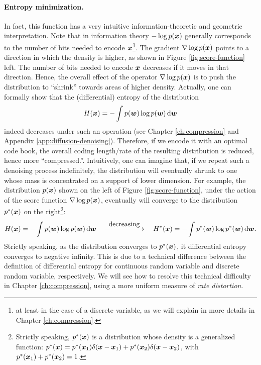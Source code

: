 \documentclass[../../book-main.tex]{subfiles}
\begin{document}
\paragraph{Entropy minimization.} In fact, this function has a very intuitive information-theoretic and geometric interpretation. Note that in information theory $-\log p(\bm{x})$ generally corresponds to the number of bits needed to encode $\bm{x}$\footnote{at least in the case of a discrete variable, as we will explain in more details in Chapter \ref{ch:compression}.}. The gradient $\nabla \log p(\bm{x})$  points to a direction in which the density is higher, as shown in Figure \ref{fig:score-function} left. The number of bits needed to encode $\bm{x}$ decreases if it moves in that direction. Hence, the overall effect of the operator $\nabla \log p(\bm{x})$ is to push the distribution to ``shrink''  towards areas of higher density. Actually, one can formally show that the (differential) entropy of the distribution 
\begin{equation}
H(\x) = - \int p(\boldsymbol{w}) \log p(\boldsymbol{w}) \odif{\boldsymbol{w}}    \end{equation} 
indeed decreases under such an operation (see Chapter \ref{ch:compression} and Appendix \ref{app:diffusion-denoising}). Therefore, if we encode it with an optimal code book, the overall coding length/rate of the resulting distribution is reduced, hence more ``compressed.''. Intuitively, one can imagine that, if we repeat such a denoising process indefinitely, the distribution will eventually shrunk to one whose mass is concentrated on a support of lower dimension. For example, the distribution $p(\bm{x})$ shown on the left of Figure \ref{fig:score-function},  under the action of the score function $\nabla \log p(\bm{x})$, eventually will converge to the distribution $p^*(\bm{x})$ on the right\footnote{Strictly speaking, $p^*(\bm{x})$ is a distribution whose density is a generalized function: $p^*(\bm{x}) = p^*(\bm{x}_1)\delta(\bm{x}-\bm{x}_1) + p^*(\bm{x}_2) \delta(\bm{x}-\bm{x}_2)$, with $p^*(\bm{x}_1) + p^*(\bm{x}_2) = 1$. }:
\begin{equation}
H(\x) = - \int p(\boldsymbol{w}) \log p(\boldsymbol{w}) \odif{\boldsymbol{w}}  \quad \xrightarrow{\hspace{1mm} \mbox{decreasing} \hspace{1mm}} \quad H^*(\x) = - \int p^*(\boldsymbol{w}) \log p^*(\boldsymbol{w}) \odif{\boldsymbol{w}}.    
\end{equation}
Strictly speaking, as the distribution converges to $p^*(\bm{x})$, it differential entropy converges to negative infinity. This is due to a technical difference between the definition of differential entropy for continuous random variable and discrete random variable, respectively. We will see how to resolve this technical difficulty in Chapter \ref{ch:compression}, using a more uniform measure of {\em rate distortion}.
\end{document}
